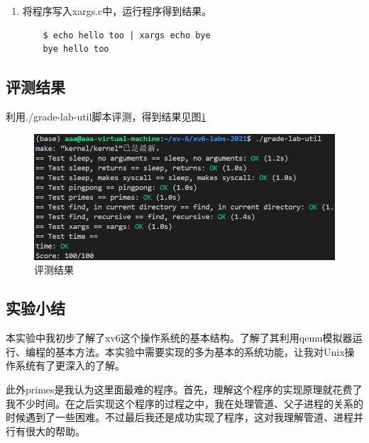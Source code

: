 \begin{enumerate}
\begin{itemize}
\begin{lstlisting}[language=c, title=回车的处理]
    args[arg_count++] = current_line; // 将当前行添加到参数数组
    args[arg_count] = 0;              // 设置参数数组的结束标志

    if (fork()) // 创建子进程
    {
        wait(0);                       // 父进程等待子进程结束
        arg_count = initial_arg_count; // 重置参数数量
    }
    else
    {
        exec(argv[1], args); // 子进程执行命令
    }
            \end{lstlisting}
          \end{itemize}
    \item 将程序写入xargs.c中，运行程序得到结果。
          \begin{lstlisting}
    $ echo hello too | xargs echo bye 
    bye hello too
    \end{lstlisting}
\end{enumerate}

\subsection{评测结果}

利用./grade-lab-util脚本评测，得到结果见图\ref{fig:util}
\begin{figure}[h]
    \centering
    \includegraphics[width=\linewidth]{pics/util评测结果.png}
    \caption{评测结果}
    \label{fig:util}
\end{figure}

\subsection{实验小结}
本实验中我初步了解了xv6这个操作系统的基本结构。了解了其利用qemu模拟器运行、编程的基本方法。本实验中需要实现的多为基本的系统功能，让我对Unix操作系统有了更深入的了解。

此外primes是我认为这里面最难的程序。首先，理解这个程序的实现原理就花费了我不少时间。在之后实现这个程序的过程之中，我在处理管道、父子进程的关系的时候遇到了一些困难。不过最后我还是成功实现了程序，这对我理解管道、进程并行有很大的帮助。